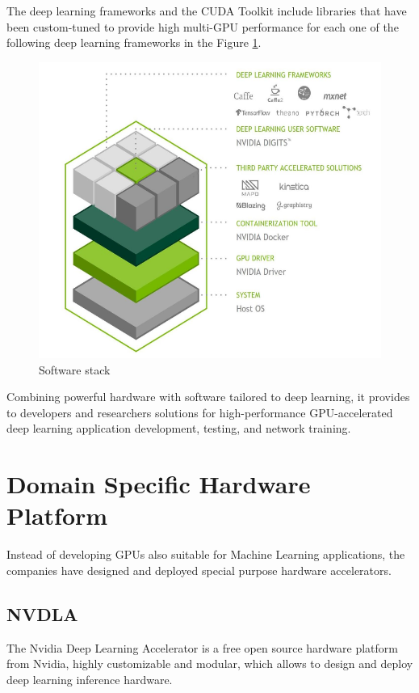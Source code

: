 \newpage
The deep learning frameworks and the CUDA Toolkit include libraries that have been custom-tuned to provide high multi-GPU performance for each one of the following deep learning frameworks in the Figure \ref{fig:swtesla}.

\begin{figure}[!htbp]
\centering
\captionsetup{justification=centering}
\includegraphics[scale=0.6]{./figure/sw_stack_tesla.PNG}
\caption{Software stack\cite{paper:41}}
\label{fig:swtesla}
\end{figure}

Combining powerful hardware with software tailored to deep learning, it provides to developers and researchers solutions for high-performance GPU-accelerated deep learning application development, testing, and network training.
\newpage
\section{Domain Specific Hardware Platform}
Instead of developing GPUs also suitable for Machine Learning applications, the companies have designed and deployed special purpose hardware accelerators.
\subsection{NVDLA}
The Nvidia Deep Learning Accelerator is a free open source hardware platform from Nvidia, highly customizable and modular, which allows to design and deploy deep learning inference hardware.

